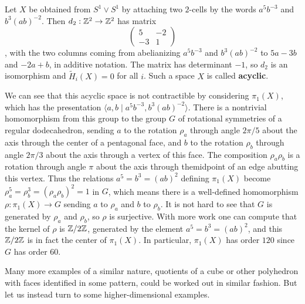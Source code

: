 \begin{example}
Let $X$ be obtained from $S^1\vee S^1$ by attaching two $2$-cells by the words $a^5b^{-3}$ and $b^3(ab)^{-2}$. Then $d_2:\mathbb{Z}^2\to\mathbb{Z}^2$ has matrix
\[\begin{pmatrix}
5&-2\\
-3&1
\end{pmatrix}\],
with the two columns coming from abelianizing $a^5b^{-3}$ and $b^3(ab)^{-2}$ to $5a-3b$ and $-2a+b$, in additive notation. The matrix has determinant $-1$, so $d_2$ is an isomorphism and $\widetilde{H}_i(X)=0$ for all $i$. Such a space $X$ is called \textbf{acyclic}.\par
We can see that this acyclic space is not contractible by considering $\pi_1(X)$, which has the presentation $\langle a,b\mid a^5b^{-3},b^3(ab)^{-2}\rangle$. There is a nontrivial homomorphism from this group to the group $G$ of rotational symmetries of a regular dodecahedron, sending $a$ to the rotation $\rho_a$ through angle $2\pi/5$ about the axis through the center of a pentagonal face, and $b$ to the rotation $\rho_b$ through angle $2\pi/3$ about the axis through a vertex of this face. The composition $\rho_a\rho_b$ is a rotation through angle $\pi$
about the axis through themidpoint of an edge abutting this vertex. Thus the relations $a^5=b^3=(ab)^2$ defining $\pi_1(X)$ become $\rho_a^5=\rho_b^3=(\rho_a\rho_b)^2=1$ in $G$, which means there is a well-defined homomorphism $\rho:\pi_1(X)\to G$ sending $a$ to $\rho_a$ and $b$ to $\rho_b$. It is not hard to see that $G$ is generated by $\rho_a$ and $\rho_b$, so $\rho$ is surjective. With more work one can compute that the kernel of $\rho$ is $\mathbb{Z}/2\mathbb{Z}$, generated by the element $a^5=b^3=(ab)^2$, and this $\mathbb{Z}/2\mathbb{Z}$ is in fact the center of $\pi_1(X)$. In particular, $\pi_1(X)$ has order $120$ since $G$ has order $60$.
\end{example}
Many more examples of a similar nature, quotients of a cube or other polyhedron with faces identified in some pattern, could be worked out in similar fashion. But let us instead turn to some higher-dimensional examples.
